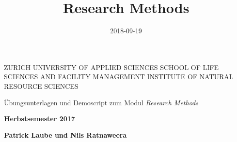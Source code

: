 \documentclass[]{book}
\title{Research Methods}
\author{}
\date{2018-09-19}
\begin{document}
\maketitle


\begin{titlepage}
\begin{center}
  
{\small 
ZURICH UNIVERSITY OF APPLIED SCIENCES
\linebreak SCHOOL OF LIFE SCIENCES AND FACILITY MANAGEMENT
\linebreak INSTITUTE OF NATURAL RESOURCE SCIENCES
}

\end{center}
\vspace{1.5cm}
\begin{center}

{\Large Übungsunterlagen und Demoscript zum Modul \emph{Research Methods}}

\end{center}
 \vspace{1cm}


\begin{center}
\textbf{Herbstsemester 2017}

\textbf{Patrick Laube und Nils Ratnaweera}
\end{center} 

\vspace{1.0cm}


\end{titlepage}
\end{document}
